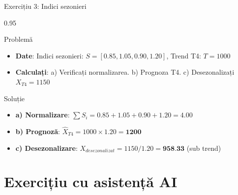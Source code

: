 \documentclass[9pt, aspectratio=169, t]{beamer}
\begin{document}
\begin{frame}{Exercițiu 3: Indici sezonieri}
    \begin{cminipage}{0.95\textwidth}
    \begin{alertblock}{Problemă}
        \begin{itemize}\setlength{\itemsep}{0pt}
            \item \textbf{Date}: Indici sezonieri: $S = [0.85, 1.05, 0.90, 1.20]$, Trend T4: $T = 1000$
            \item \textbf{Calculați}: a) Verificați normalizarea. b) Prognoza T4. c) Desezonalizați $X_{T4} = 1150$
        \end{itemize}
    \end{alertblock}

    \vspace{0.2cm}
    \begin{exampleblock}{Soluție}
        \begin{itemize}\setlength{\itemsep}{0pt}
            \item \textbf{a) Normalizare}: $\sum S_i = 0.85+1.05+0.90+1.20 = 4.00$ \checkmark
            \item \textbf{b) Prognoză}: $\hat{X}_{T4} = 1000 \times 1.20 = \textbf{1200}$
            \item \textbf{c) Desezonalizare}: $X_{desezonalizat} = 1150/1.20 = \textbf{958.33}$ (sub trend)
        \end{itemize}
    \end{exampleblock}
    \end{cminipage}
\end{frame}

\section{Exercițiu cu asistență AI}
\end{document}
